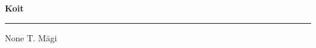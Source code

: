\documentclass[10pt]{book}
\begin{document}
{
  \samepage
  \raggedbottom
  \raggedright
  \sloppy


  \vspace{0.2in}

  \noindent\begin{minipage}{.1\textwidth}
    \hfill\vspace{0.1in}
  \end{minipage}%
  \noindent\begin{minipage}{.8\textwidth}
    \centering
    \bfseries
    \large Koit
  \end{minipage}%
  \noindent\begin{minipage}{.1\textwidth}
      \hfill\vspace{0.1in}
  \end{minipage}

  \nopagebreak[4]
  \vspace{0.1in}
  \nopagebreak[4]
  \hrule height 0.05ex
  \nopagebreak[4]
  \vspace{-0.05in}

  {\footnotesize None \hfill T. M\"agi }\\
  \vspace{0.01in}



}
\end{document}
